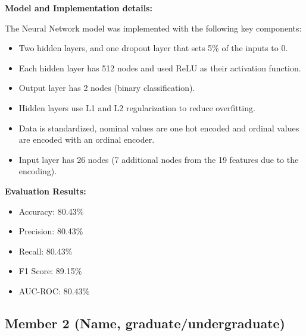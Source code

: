 \documentclass[11pt,a4paper]{article}
\begin{document}
\begin{tcolorbox}[
        title=Neural Network Implementation,
        colback=lightblue!30,
        colframe=darkblue,
        boxrule=0.5pt,
        fonttitle=\bfseries\sffamily\footnotesize,
        fontupper=\footnotesize
    ]
    \textbf{Model and Implementation details:}

    The Neural Network model was implemented with the following key components:
    \begin{itemize}[leftmargin=*, itemsep=2pt, parsep=0pt]
        \item Two hidden layers, and one dropout layer that sets 5\% of the inputs to 0.
        \item Each hidden layer has 512 nodes and used ReLU as their activation function.
        \item Output layer has 2 nodes (binary classification).
        \item Hidden layers use L1 and L2 regularization to reduce overfitting.
        \item Data is standardized, nominal values are one hot encoded and ordinal values are encoded with an ordinal encoder.
        \item Input layer has 26 nodes (7 additional nodes from the 19 features due to the encoding).
    \end{itemize}

    \textbf{Evaluation Results:}
    \begin{itemize}[leftmargin=*, itemsep=2pt, parsep=0pt]
        \item Accuracy: 80.43\%
        \item Precision: 80.43\%
        \item Recall: 80.43\%
        \item F1 Score: 89.15\%
        \item AUC-ROC: 80.43\%
    \end{itemize}
\end{tcolorbox}

\subsection{Member 2 (Name, graduate/undergraduate)}
\end{document}
